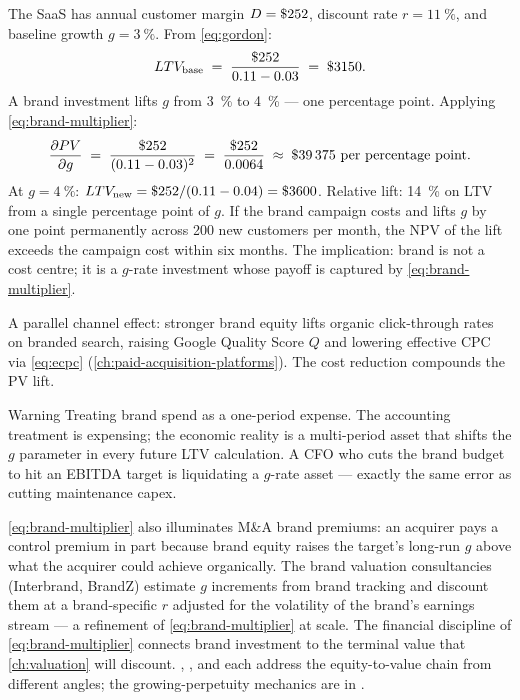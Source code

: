 \begin{example}
The SaaS has annual customer margin \(D = \$\num{252}\), discount rate \(r = \qty{11}{\percent}\), and baseline growth \(g = \qty{3}{\percent}\). From \cref{eq:gordon}:
\[
  LTV_{\text{base}} \;=\; \frac{\$\num{252}}{0.11-0.03} \;=\; \$\num{3150}.
\]
A brand investment lifts \(g\) from \qty{3}{\percent} to \qty{4}{\percent} --- one percentage point. Applying \cref{eq:brand-multiplier}:
\[
  \frac{\partial PV}{\partial g} \;=\; \frac{\$\num{252}}{(0.11-0.03)^2} \;=\; \frac{\$\num{252}}{0.0064} \;\approx\; \$\num{39375} \text{ per percentage point}.
\]
At \(g=\qty{4}{\percent}\): \(LTV_{\text{new}} = \$\num{252}/(0.11-0.04) = \$\num{3600}\). Relative lift: \qty{14}{\percent} on LTV from a single percentage point of \(g\). If the brand campaign costs  and lifts \(g\) by one point permanently across 200 new customers per month, the NPV of the lift exceeds the campaign cost within six months. The implication: brand is not a cost centre; it is a \(g\)-rate investment whose payoff is captured by \cref{eq:brand-multiplier}.

A parallel channel effect: stronger brand equity lifts organic click-through rates on branded search, raising Google Quality Score \(Q\) and lowering effective CPC via \cref{eq:ecpc} (\cref{ch:paid-acquisition-platforms}). The cost reduction compounds the PV lift.
\end{example}

\begin{admonition}{Warning}
Treating brand spend as a one-period expense. The accounting treatment is expensing; the economic reality is a multi-period asset that shifts the \(g\) parameter in every future LTV calculation. A CFO who cuts the brand budget to hit an EBITDA target is liquidating a \(g\)-rate asset --- exactly the same error as cutting maintenance capex.
\end{admonition}

\cref{eq:brand-multiplier} also illuminates M\&A brand premiums: an acquirer pays a control premium in part because brand equity raises the target's long-run \(g\) above what the acquirer could achieve organically. The brand valuation consultancies (Interbrand, BrandZ) estimate \(g\) increments from brand tracking and discount them at a brand-specific \(r\) adjusted for the volatility of the brand's earnings stream --- a refinement of \cref{eq:brand-multiplier} at scale. The financial discipline of \cref{eq:brand-multiplier} connects brand investment to the terminal value that \cref{ch:valuation} will discount. \textcite{keller1993customer}, \textcite{keller2019}, and \textcite{aaker1996} each address the equity-to-value chain from different angles; the growing-perpetuity mechanics are in \textcite{brealey2020}.

